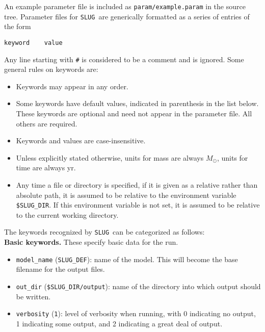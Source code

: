 \documentclass[12pt]{article}
\newcommand{\slug}{\texttt{SLUG}}
\begin{document}
An example parameter file is included as \verb=param/example.param= in the source tree. Parameter files for \slug\ are generically formatted as a series of entries of the form
\begin{verbatim}
keyword    value
\end{verbatim}
Any line starting with \verb=#= is considered to be a comment and is ignored. Some general rules on keywords are:
\begin{itemize}
\item Keywords may appear in any order.
\item Some keywords have default values, indicated in parenthesis in the list below. These keywords are optional and need not appear in the parameter file. All others are required. 
\item Keywords and values are case-insensitive. 
\item Unless explicitly stated otherwise, units for mass are always $M_\odot$, units for time are always yr.
\item Any time a file or directory is specified, if it is given as a relative rather than absolute path, it is assumed to be relative to the environment variable \verb=$SLUG_DIR=. If this environment variable is not set, it is assumed to be relative to the current working directory.
\end{itemize}

The keywords recognized by \slug\ can be categorized as follows:\\

\noindent
\textbf{Basic keywords.} These specify basic data for the run.
\begin{itemize}
\item \verb=model_name= (\verb=SLUG_DEF=): name of the model. This will become the base filename for the output files.
\item \verb=out_dir= (\verb=$SLUG_DIR/output=): name of the directory into which output should be written.
\item \verb=verbosity= (\verb=1=): level of verbosity when running, with 0 indicating no output, 1 indicating some output, and 2 indicating a great deal of output.
\end{itemize}
\end{document}
